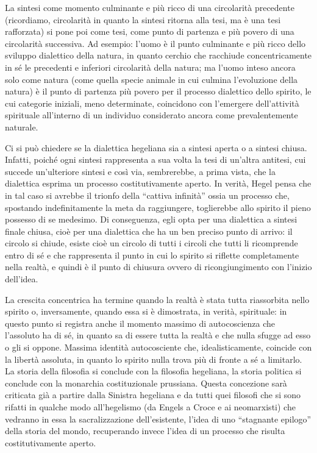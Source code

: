\documentclass[a4paper,12pt,oneside,openany]{book}%
\begin{document}
La sintesi come momento culminante e più ricco di una circolarità precedente (ricordiamo, circolarità in quanto la sintesi ritorna alla tesi, ma è una tesi rafforzata) si pone poi come tesi, come punto di partenza e più povero di una circolarità successiva. Ad esempio: l’uomo è il punto culminante e più ricco dello sviluppo dialettico della natura, in quanto cerchio che racchiude concentricamente in sé le precedenti e inferiori circolarità della natura; ma l’uomo inteso ancora solo come natura (come quella specie animale in cui culmina l’evoluzione della natura) è il punto di partenza più povero per il processo dialettico dello spirito, le cui categorie iniziali, meno determinate, coincidono con l’emergere dell’attività spirituale all’interno di un individuo considerato ancora come prevalentemente naturale.

Ci si può chiedere se la dialettica hegeliana sia a sintesi aperta o a sintesi chiusa. Infatti, poiché ogni sintesi rappresenta a sua volta la tesi di un’altra antitesi, cui succede un’ulteriore sintesi e così via, sembrerebbe, a prima vista, che la dialettica esprima un processo costitutivamente aperto. In verità, Hegel pensa che in tal caso si avrebbe il trionfo della “cattiva infinità” ossia un processo che, spostando indefinitamente la me­ta da raggiungere, toglierebbe allo spirito il pieno possesso di se medesimo. Di conse­guenza, egli opta per una dialettica a sintesi finale chiusa, cioè per una dialettica che ha un ben preciso punto di arrivo: il circolo si chiude, esiste cioè un circolo di tutti i circoli che tutti li ricomprende entro di sé e che rappresenta il punto in cui lo spirito si riflette completamente nella realtà, e quindi è il punto di chiusura ovvero di ricongiungimento con l’inizio dell’idea.

La crescita concentrica ha termine quando la realtà è stata tutta riassorbita nello spirito o, inversamente, quando essa si è dimostrata, in verità, spirituale: in questo punto si registra anche il momento massimo di autocoscienza che l’assoluto ha di sé, in quanto sa di essere tutta la realtà e che nulla sfugge ad esso o gli si oppone. Massima identità autocosciente che, idealisticamente, coincide con la libertà assoluta, in quanto lo spirito nulla trova più di fronte a sé a limitarlo. La storia della filosofia si conclude con la filosofia hegeliana, la storia politica si conclude con la monarchia costituzionale prussiana. Questa concezione sarà criticata già a partire dalla Sinistra hegeliana e da tutti quei filosofi che si sono rifatti in qualche modo all’hegelismo (da Engels a Croce e ai neomarxisti) che vedranno in essa la sacralizzazione dell’esistente, l’idea di uno “stagnante epilogo” della storia del mondo, recuperando invece l’idea di un processo che risulta costitutivamente aperto.
\end{document}
